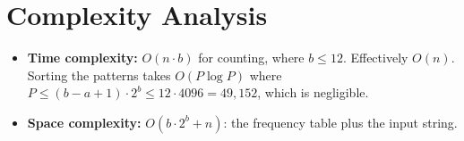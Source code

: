 \documentclass[11pt,a4paper]{article}
\begin{document}
\section{Complexity Analysis}

\begin{itemize}
  \item \textbf{Time complexity:} $O(n \cdot b)$ for counting, where $b \le 12$.
        Effectively $O(n)$. Sorting the patterns takes $O(P \log P)$ where
        $P \le (b - a + 1) \cdot 2^b \le 12 \cdot 4096 = 49{,}152$, which is negligible.
  \item \textbf{Space complexity:} $O(b \cdot 2^b + n)$: the frequency table plus the
        input string.
\end{itemize}
\end{document}
